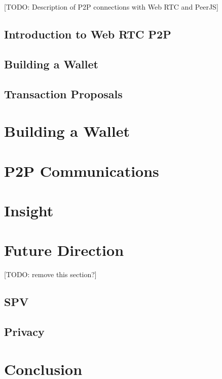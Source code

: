 \documentclass{article}
\begin{document}
[TODO: Description of P2P connections with Web RTC and PeerJS]

\subsection{Introduction to Web RTC P2P}

\subsection{Building a Wallet}

\subsection{Transaction Proposals}

\section{Building a Wallet}

\section{P2P Communications}

\section{Insight}

\section{Future Direction}

[TODO: remove this section?]

\subsection{SPV}

\subsection{Privacy}

\section{Conclusion}
\end{document}
